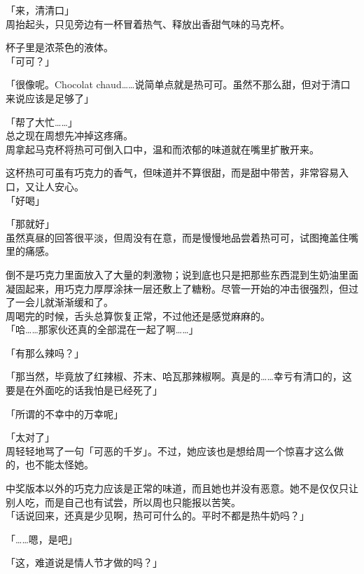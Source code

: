 「来，清清口」\\

周抬起头，只见旁边有一杯冒着热气、释放出香甜气味的马克杯。

杯子里是浓茶色的液体。\\

「可可？」

「很像呢。Chocolat chaud……说简单点就是热可可。虽然不那么甜，但对于清口来说应该是足够了」

「帮了大忙……」\\

总之现在周想先冲掉这疼痛。\\

周拿起马克杯将热可可倒入口中，温和而浓郁的味道就在嘴里扩散开来。

这杯热可可虽有巧克力的香气，但味道并不算很甜，而是甜中带苦，非常容易入口，又让人安心。\\

「好喝」

「那就好」\\

虽然真昼的回答很平淡，但周没有在意，而是慢慢地品尝着热可可，试图掩盖住嘴里的痛感。

倒不是巧克力里面放入了大量的刺激物；说到底也只是把那些东西混到生奶油里面凝固起来，用巧克力厚厚涂抹一层还敷上了糖粉。尽管一开始的冲击很强烈，但过了一会儿就渐渐缓和了。\\

周喝完的时候，舌头总算恢复正常，不过他还是感觉麻麻的。\\

「哈……那家伙还真的全部混在一起了啊……」

「有那么辣吗？」

「那当然，毕竟放了红辣椒、芥末、哈瓦那辣椒啊。真是的……幸亏有清口的，这要是在外面吃的话我怕是已经死了」

「所谓的不幸中的万幸呢」

「太对了」\\

周轻轻地骂了一句「可恶的千岁」。不过，她应该也是想给周一个惊喜才这么做的，也不能太怪她。

中奖版本以外的巧克力应该是正常的味道，而且她也并没有恶意。她不是仅仅只让别人吃，而是自己也有试尝，所以周也只能报以苦笑。\\

「话说回来，还真是少见啊，热可可什么的。平时不都是热牛奶吗？」

「……嗯，是吧」

「这，难道说是情人节才做的吗？」\\

